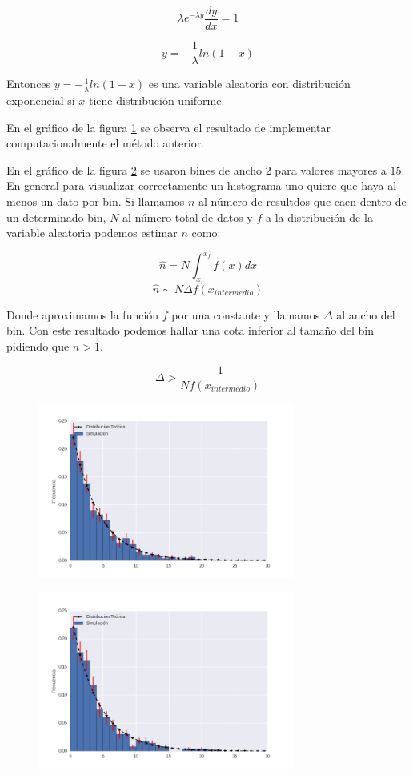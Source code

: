 \documentclass{article}
\begin{document}
$$\lambda e^{-\lambda y} \frac{dy}{dx} = 1 $$

$$ y = -\frac{1}{\lambda} ln(1-x)$$

Entonces $y = -\frac{1}{\lambda} ln(1-x)$ es una variable aleatoria con distribución exponencial si $x$ tiene distribución uniforme.

En el gráfico de la figura \ref{fig:ej9b_1} se observa el resultado de implementar computacionalmente el método anterior.

En el gráfico de la figura \ref{fig:ej9b_2} se usaron bines de ancho $2$ para valores mayores a $15$.
En general para visualizar correctamente un histograma uno quiere que haya al menos un dato por bin. 
Si llamamos $n$ al número de resultdos que caen dentro de un determinado bin, $N$ al número total de datos y $f$ a la distribución de la variable aleatoria podemos estimar $n$ como:

$$ \hat n = N \int_{x_i}^{x_f} f(x) dx$$
$$ \hat n \sim N \Delta f(x_{intermedio}) $$

Donde aproximamos la función $f$ por una constante y llamamos $\Delta$ al ancho del bin.
Con este resultado podemos hallar una cota inferior al tamaño del bin pidiendo que $n>1$.

$$  \Delta > \frac{1}{N f(x_{intermedio})} $$

\begin{figure}
\centering
\includegraphics[width=0.75\textwidth]{ej9b_1.jpg}
\caption[]{}
\label{fig:ej9b_1}
\end{figure}

\begin{figure}
\centering
\includegraphics[width=0.75\textwidth]{ej9b_2.jpg}
\caption[]{}
\label{fig:ej9b_2}
\end{figure}
\end{document}
